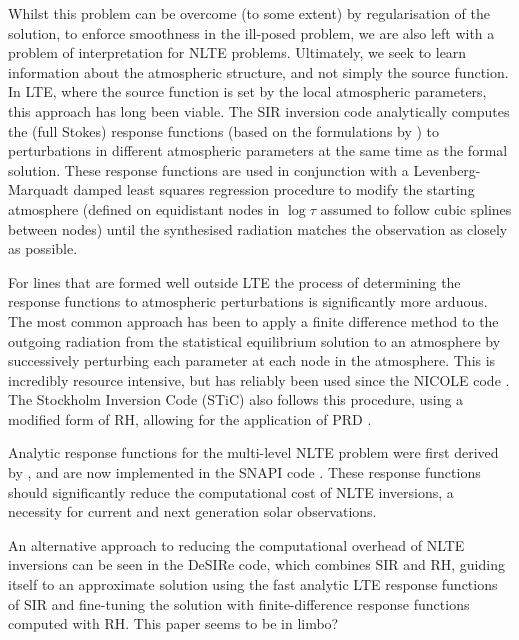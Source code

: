 Whilst this problem can be overcome (to some extent) by regularisation of the solution, to enforce smoothness in the ill-posed problem, we are also left with a problem of interpretation for NLTE problems.
Ultimately, we seek to learn information about the atmospheric structure, and not simply the source function.
In LTE, where the source function is set by the local atmospheric parameters, this approach has long been viable.
The SIR inversion code \citep{1992RuizCobo} analytically computes the (full Stokes) response functions (based on the formulations by \citet{SanchezAlmeida1992}) to perturbations in different atmospheric parameters at the same time as the formal solution.
These response functions are used in conjunction with a Levenberg-Marquadt damped least squares regression procedure to modify the starting atmosphere (defined on equidistant nodes in $\log \tau$ assumed to follow cubic splines between nodes) until the synthesised radiation matches the observation as closely as possible.

For lines that are formed well outside LTE the process of determining the response functions to atmospheric perturbations is significantly more arduous.
The most common approach has been to apply a finite difference method to the outgoing radiation from the statistical equilibrium solution to an atmosphere by successively perturbing each parameter at each node in the atmosphere.
This is incredibly resource intensive, but has reliably been used since the NICOLE code \citep[developed from \citet{SocasNavarro2000} but no longer using fixed departure coefficients]{Socas-Navarro2015}.
The Stockholm Inversion Code (STiC) also follows this procedure, using a modified form of RH, allowing for the application of PRD \citep{2019dlcr}.

Analytic response functions for the multi-level NLTE problem were first derived by \citet{Milic2017}, and are now implemented in the SNAPI code \citep{Milic2018}.
These response functions should significantly reduce the computational cost of NLTE inversions, a necessity for current and next generation solar observations.

An alternative approach to reducing the computational overhead of NLTE inversions can be seen in the DeSIRe code, which combines SIR and RH, guiding itself to an approximate solution using the fast analytic LTE response functions of SIR and fine-tuning the solution with finite-difference response functions computed with RH. \NeedRef{} {\color{Red} This paper seems to be in limbo?}

